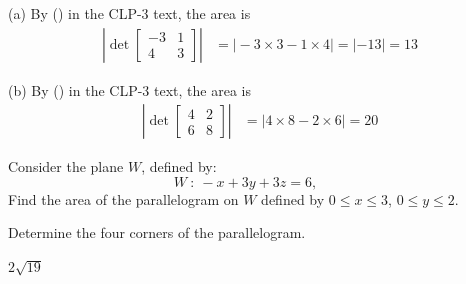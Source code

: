 \begin{solution} (a)
By () in the CLP-3 text, the area is 
\begin{align*}
\left| \det\left[\begin{matrix}-3&1 \\ 4&3 \end{matrix}\right] \right|
  &=\big|-3\times 3-1\times 4\big| = |-13| = 13
\end{align*}

(b)
By () in the CLP-3 text, the area is 
\begin{align*}
\left|\det\left[\begin{matrix} 4&2 \\ 6&8 \end{matrix}\right]\right| 
&=\big|4\times 8-2\times 6\big| 
= 20
\end{align*}
\end{solution}

\begin{question}[M200 2014A] %
Consider the plane $W$, defined by:
\begin{equation*}
W\ :\ -x + 3y + 3z = 6,\qquad
\end{equation*}
Find the area of the parallelogram on $W$ defined by 
$0 \le x \le 3$, $0 \le y \le 2$.
\end{question}

\begin{hint}
Determine the four corners of the parallelogram.
\end{hint}

\begin{answer}
$2\sqrt{19}$
\end{answer}

